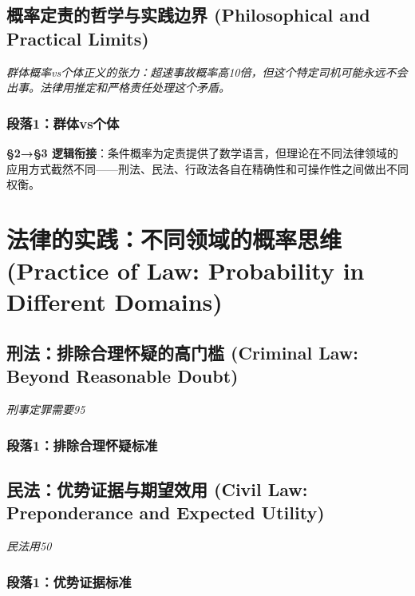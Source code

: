 \documentclass[a4paper,12pt]{book}
\newenvironment{motivation}{\begin{tcolorbox}[colback=gray!10,colframe=gray!60,title=\textit{动机}]\small\itshape}{\end{tcolorbox}}
\begin{document}
\begin{motivation}
\begin{motivation}
\begin{motivation}
	\subsection{概率定责的哲学与实践边界 (Philosophical and Practical Limits)}
	\begin{motivation}
		群体概率vs个体正义的张力：超速事故概率高10倍，但这个特定司机可能永远不会出事。法律用推定和严格责任处理这个矛盾。\end{motivation}
	\subsubsection*{段落1：群体vs个体}

	\textbf{§2→§3 逻辑衔接}：条件概率为定责提供了数学语言，但理论在不同法律领域的应用方式截然不同——刑法、民法、行政法各自在精确性和可操作性之间做出不同权衡。

	\section{法律的实践：不同领域的概率思维 (Practice of Law: Probability in Different Domains)}

	\subsection{刑法：排除合理怀疑的高门槛 (Criminal Law: Beyond Reasonable Doubt)}
	\begin{motivation}刑事定罪需要95%
	\subsubsection*{段落1：排除合理怀疑标准}

	\subsection{民法：优势证据与期望效用 (Civil Law: Preponderance and Expected Utility)}
	\begin{motivation}民法用50%
	\subsubsection*{段落1：优势证据标准}


\end{motivation}
\end{motivation}
\end{motivation}
\end{motivation}
\end{motivation}
\end{document}

